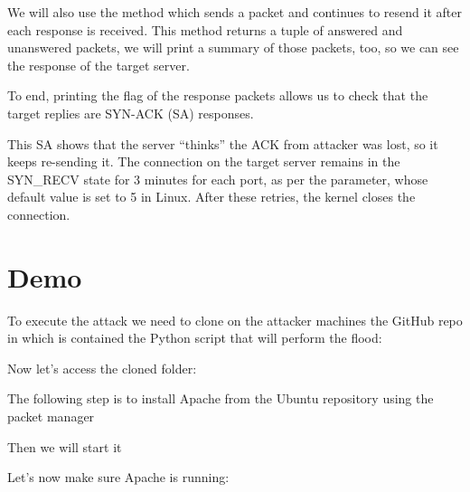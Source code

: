 \documentclass[11pt]{article}
\begin{document}
We will also use the method \texttt{} which sends a packet and continues to resend it after each response is received. This method returns a tuple of answered and unanswered packets, we will print a summary of those packets, too, so we can see the response of the target server.\vspace{5mm}

To end, printing the flag of the response packets allows us to check that the target replies are SYN-ACK (SA) responses.\vspace{5mm}

This SA shows that the server “thinks” the ACK from attacker was lost, so it keeps re-sending it. The connection on the target server remains in the SYN\_RECV state for 3 minutes for each port, as per the \texttt{} parameter, whose default value is set to 5 in Linux. After these retries, the kernel closes the connection.\vspace{5mm}

\section{Demo}
To execute the attack we need to clone on the attacker machines the GitHub repo in which is contained the Python script that will perform the flood:
\begin{center}
	\texttt{}
\end{center}\vspace{5mm}

Now let's access the cloned folder: \texttt{}\vspace{5mm}

The following step is to install Apache from the Ubuntu repository using the packet manager
\begin{center}
	\texttt{}
\end{center}\vspace{5mm}

Then we will start it
\begin{center}
	\texttt{}
\end{center}\vspace{5mm}

Let's now make sure Apache is running:
\begin{center}
	\texttt{}
\end{center}\vspace{5mm}
\end{document}
